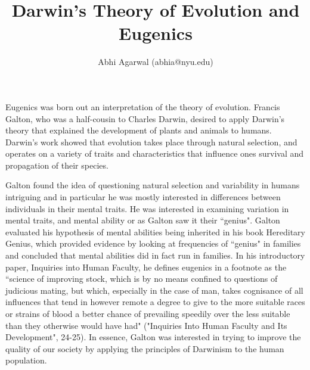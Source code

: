 \documentclass[11pt, oneside]{article}
\title{Darwin's Theory of Evolution and Eugenics}
\author{Abhi Agarwal (abhia@nyu.edu)}
\date{}
\begin{document}
\maketitle

\par 


\par 
Eugenics was born out an interpretation of the theory of evolution. Francis Galton, who was a half-cousin to Charles Darwin, desired to apply Darwin's theory that explained the development of plants and animals to humans. Darwin's work showed that evolution takes place through natural selection, and operates on a variety of traits and characteristics that influence ones survival and propagation of their species. 
\par Galton found the idea of questioning natural selection and variability in humans intriguing and in particular he was mostly interested in differences between individuals in their mental traits. He was interested in examining variation in mental traits, and mental ability or as Galton saw it their ``genius". Galton evaluated his hypothesis of mental abilities being inherited in his book Hereditary Genius, which provided evidence by looking at frequencies of ``genius" in families and concluded that mental abilities did in fact run in families. 
In his introductory paper, Inquiries into Human Faculty, he defines eugenics in a footnote as the ``science of improving stock, which is by no means confined to questions of judicious mating, but which, especially in the case of man, takes cognisance of all influences that tend in however remote a degree to give to the more suitable races or strains of blood a better chance of prevailing speedily over the less suitable than they otherwise would have had" ("Inquiries Into Human Faculty and Its Development", 24-25). In essence, Galton was interested in trying to improve the quality of our society by applying the principles of Darwinism to the human population. 
\end{document}
